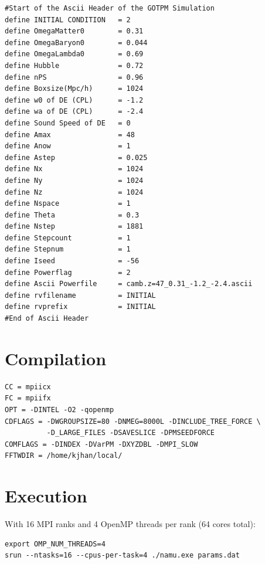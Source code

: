 \documentclass[11pt,fleqn]{book}
\begin{document}
\begin{codebox}
\begin{lstlisting}[style=paramstyle]
#Start of the Ascii Header of the GOTPM Simulation
define INITIAL CONDITION   = 2
define OmegaMatter0        = 0.31
define OmegaBaryon0        = 0.044
define OmegaLambda0        = 0.69
define Hubble              = 0.72
define nPS                 = 0.96
define Boxsize(Mpc/h)      = 1024
define w0 of DE (CPL)      = -1.2
define wa of DE (CPL)      = -2.4
define Sound Speed of DE   = 0
define Amax                = 48
define Anow                = 1
define Astep               = 0.025
define Nx                  = 1024
define Ny                  = 1024
define Nz                  = 1024
define Nspace              = 1
define Theta               = 0.3
define Nstep               = 1881
define Stepcount           = 1
define Stepnum             = 1
define Iseed               = -56
define Powerflag           = 2
define Ascii Powerfile     = camb.z=47_0.31_-1.2_-2.4.ascii
define rvfilename          = INITIAL
define rvprefix            = INITIAL
#End of Ascii Header
\end{lstlisting}
\end{codebox}

\section{Compilation}

\begin{codebox}
\begin{lstlisting}[style=bash,numbers=none]
CC = mpiicx
FC = mpiifx
OPT = -DINTEL -O2 -qopenmp
CDFLAGS = -DWGROUPSIZE=80 -DNMEG=8000L -DINCLUDE_TREE_FORCE \
          -D_LARGE_FILES -DSAVESLICE -DPMSEEDFORCE
COMFLAGS = -DINDEX -DVarPM -DXYZDBL -DMPI_SLOW
FFTWDIR = /home/kjhan/local/
\end{lstlisting}
\end{codebox}

\section{Execution}

With 16 MPI ranks and 4 OpenMP threads per rank (64 cores total):

\begin{codebox}
\begin{lstlisting}[style=bash,numbers=none]
export OMP_NUM_THREADS=4
srun --ntasks=16 --cpus-per-task=4 ./namu.exe params.dat
\end{lstlisting}
\end{codebox}
\end{document}
